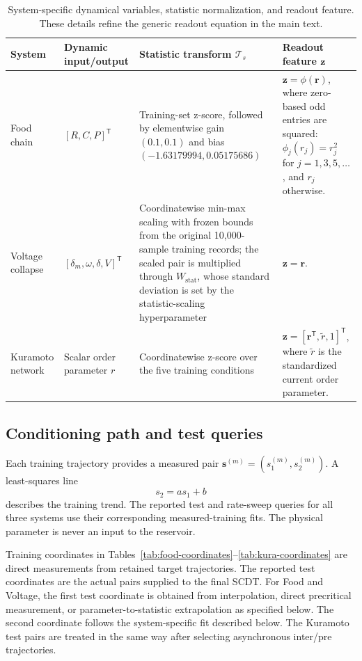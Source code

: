\documentclass[10pt,a4paper]{article}
\begin{document}
\begin{table}[ht]
\centering
\caption{System-specific dynamical variables, statistic normalization, and
readout feature. These details refine the generic readout equation in the main
text.}
\label{tab:readout}
\small
\begin{tabularx}{\textwidth}{L{27mm} L{34mm} Y Y}
\toprule
System & Dynamic input/output & Statistic transform $\mathcal{T}_s$ & Readout feature $\bm{z}$ \\
\midrule
Food chain & $[R,C,P]^{\mathsf T}$
& Training-set z-score, followed by elementwise gain $(0.1,0.1)$ and bias
$(-1.63179994,0.05175686)$
& $\bm{z}=\phi(\bm r)$, where zero-based odd entries are squared:
$\phi_j(r_j)=r_j^2$ for $j=1,3,5,\ldots$, and $r_j$ otherwise. \\
Voltage collapse & $[\delta_m,\omega,\delta,V]^{\mathsf T}$
& Coordinatewise min-max scaling with frozen bounds from the original
10,000-sample training records; the scaled
pair is multiplied through $W_{\mathrm{stat}}$, whose standard deviation is
set by the statistic-scaling hyperparameter
& $\bm{z}=\bm r$. \\
Kuramoto network & Scalar order parameter $r$
& Coordinatewise z-score over the five training conditions
& $\bm{z}=[\bm r^{\mathsf T},\widetilde r,1]^{\mathsf T}$, where
$\widetilde r$ is the standardized current order parameter. \\
\bottomrule
\end{tabularx}
\end{table}

\subsection{Conditioning path and test queries}

Each training trajectory provides a measured pair
$\bm{s}^{(m)}=(s_1^{(m)},s_2^{(m)})$. A least-squares line
\begin{equation}
  s_2=a s_1+b
  \label{eq:conditioning-path}
\end{equation}
describes the training trend. The reported test and rate-sweep queries for all
three systems use their corresponding measured-training fits. The physical
parameter is never an input to the reservoir.

Training coordinates in Tables~\ref{tab:food-coordinates}--\ref{tab:kura-coordinates}
are direct measurements from retained target trajectories. The reported test
coordinates are the actual pairs supplied to the final SCDT. For Food and
Voltage, the first test coordinate is obtained from interpolation, direct
precritical measurement, or parameter-to-statistic extrapolation as specified
below. The second coordinate follows the system-specific fit described below.
The Kuramoto test pairs are treated in the same way after selecting asynchronous
inter/pre trajectories.
\end{document}
